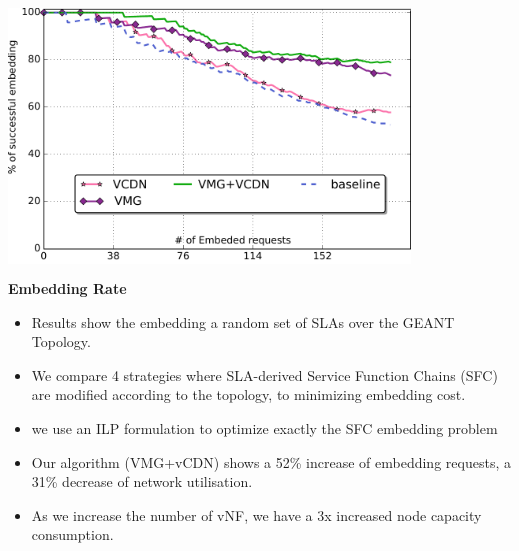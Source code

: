\documentclass[portrait,final,a0paper]{baposter}
\begin{document}
\begin{poster}
{\begin{multicols}{2}
\begin{minipage}{0.6\textwidth}
						\colorbox{white}{\includegraphics[width=0.8\textwidth]{0-embedding.pdf}}
						\begin{center}\textbf{Embedding Rate}
					
						\end{center}
					\end{minipage}
				
				\begin{itemize}
					
				\item Results show the embedding a random set of SLAs over the GEANT Topology.
				\item We compare 4 strategies where SLA-derived Service Function Chains (SFC) are modified according to the topology, to minimizing embedding cost.
				\item we use an ILP formulation to optimize exactly the SFC embedding problem
				\item Our algorithm (VMG+vCDN) shows a 52\% increase of embedding requests, a 31\% decrease of network utilisation.
				\item As we increase the number of vNF, we have a 3x increased node capacity consumption.
					
				\end{itemize}
	
	
	
					
	\end{multicols}
	
   
 }
 
\end{poster}
\end{document}
